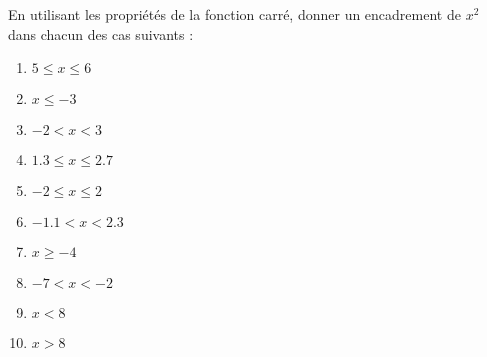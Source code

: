 
\begin{exercice}\label{exosmath-0139}

    En utilisant les propriétés de la fonction carré, donner un encadrement de \( x^2\) dans chacun des cas suivants :
    \begin{multicols}{2}
    \begin{enumerate}
        \item
            \( 5\leq x\leq 6\)
        \item
            \( x\leq -3\)
        \item
            \( -2 < x < 3\)
        \item
            \( 1.3\leq x\leq 2.7\)
        \item
            \( -2\leq x\leq 2\)
        \item
            \( -1.1< x<2.3\)
        \item
            \( x\geq -4\)
        \item
            \( -7<x<-2\)
        \item
            \( x<8\)
        \item
            \( x>8\)
    \end{enumerate}
    \end{multicols}

\end{exercice}

